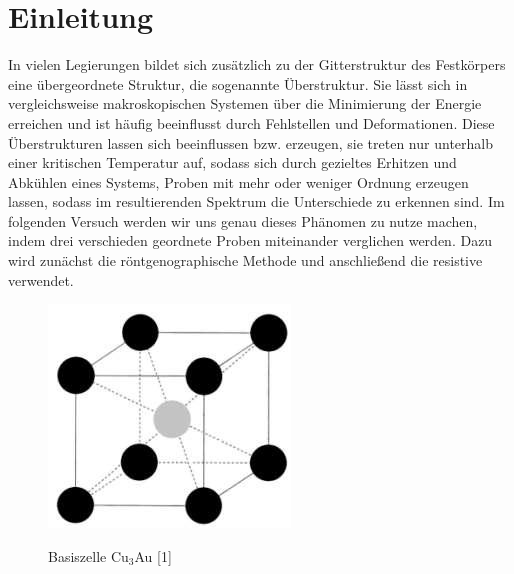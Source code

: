 \section{Einleitung}
    In vielen Legierungen bildet sich zusätzlich zu der Gitterstruktur des Festkörpers eine übergeordnete
    Struktur, die sogenannte Überstruktur. Sie lässt sich in vergleichsweise makroskopischen Systemen
    über die Minimierung der Energie erreichen und ist häufig beeinflusst durch Fehlstellen und Deformationen.
    Diese Überstrukturen lassen sich beeinflussen bzw. erzeugen, sie treten nur unterhalb einer kritischen
    Temperatur auf, sodass sich durch gezieltes Erhitzen und Abkühlen eines Systems, Proben mit mehr
    oder weniger Ordnung erzeugen lassen, sodass im resultierenden Spektrum die Unterschiede zu erkennen sind.
    Im folgenden Versuch werden wir uns genau dieses Phänomen zu nutze machen, indem drei verschieden geordnete
    Proben miteinander verglichen werden. Dazu wird zunächst die röntgenographische Methode und anschließend
    die resistive verwendet.

    \begin{figure}[H]
        \centering
        \includegraphics{images/einleitung_hurensohn.jpg}
        \label{einleitung}
        \caption{Basiszelle Cu$_3$Au [1]}
    \end{figure}